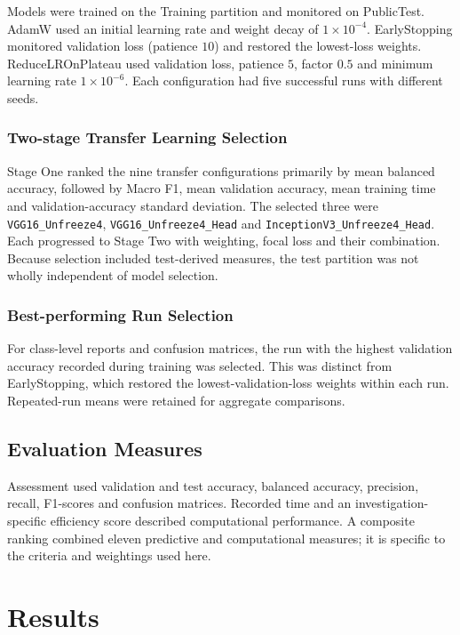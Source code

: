 \documentclass[10pt, a4paper]{article}
\let\oldsection\section
\renewcommand{\section}{%
    \Needspace{4\baselineskip}%
    \oldsection
}
\let\oldsubsection\subsection
\renewcommand{\subsection}{%
    \Needspace{4\baselineskip}%
    \oldsubsection
}
\let\oldsubsubsection\subsubsection
\renewcommand{\subsubsection}{%
    \Needspace{4\baselineskip}%
    \oldsubsubsection
}
\begin{document}
				Models were trained on the Training partition and monitored on PublicTest. AdamW used an initial learning rate and weight decay of $1\times10^{-4}$. EarlyStopping monitored validation loss (patience $10$) and restored the lowest-loss weights. ReduceLROnPlateau used validation loss, patience $5$, factor $0.5$ and minimum learning rate $1\times10^{-6}$. Each configuration had five successful runs with different seeds.
			
			\subsubsection{Two-stage Transfer Learning Selection}
			
				Stage One ranked the nine transfer configurations primarily by mean balanced accuracy, followed by Macro F1, mean validation accuracy, mean training time and validation-accuracy standard deviation. The selected three were \texttt{VGG16\_Unfreeze4}, \texttt{VGG16\_Unfreeze4\_Head} and \texttt{InceptionV3\_Unfreeze4\_Head}. Each progressed to Stage Two with weighting, focal loss and their combination. Because selection included test-derived measures, the test partition was not wholly independent of model selection.
			
			\subsubsection{Best-performing Run Selection}
				
				For class-level reports and confusion matrices, the run with the highest validation accuracy recorded during training was selected. This was distinct from EarlyStopping, which restored the lowest-validation-loss weights within each run. Repeated-run means were retained for aggregate comparisons.
				
		\subsection{Evaluation Measures}
			
			Assessment used validation and test accuracy, balanced accuracy, precision, recall, F1-scores and confusion matrices. Recorded time and an investigation-specific efficiency score described computational performance. A composite ranking combined eleven predictive and computational measures; it is specific to the criteria and weightings used here.
			
	
	\section{Results}
	
\end{document}
